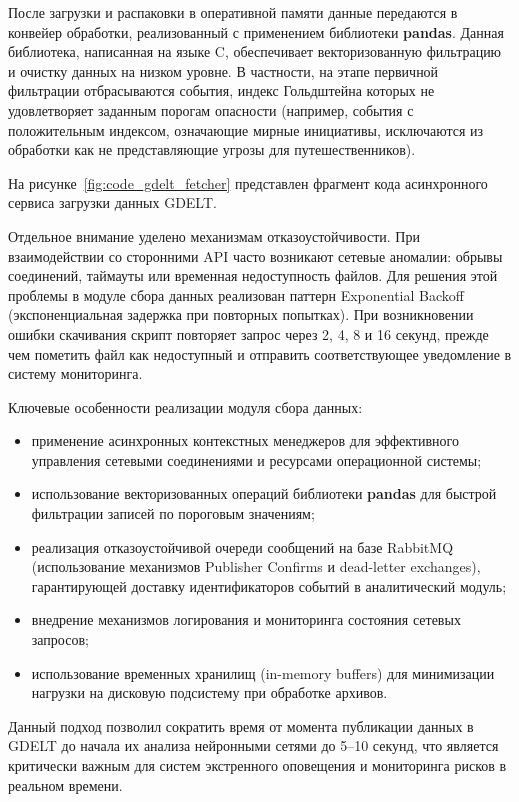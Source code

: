 После загрузки и распаковки в оперативной памяти данные передаются в конвейер обработки, реализованный с применением библиотеки \textbf{pandas}. Данная библиотека, написанная на языке C, обеспечивает векторизованную фильтрацию и очистку данных на низком уровне. В частности, на этапе первичной фильтрации отбрасываются события, индекс Гольдштейна которых не удовлетворяет заданным порогам опасности (например, события с положительным индексом, означающие мирные инициативы, исключаются из обработки как не представляющие угрозы для путешественников).

На рисунке~\ref{fig:code_gdelt_fetcher} представлен фрагмент кода асинхронного сервиса загрузки данных GDELT.


Отдельное внимание уделено механизмам отказоустойчивости. При взаимодействии со сторонними API часто возникают сетевые аномалии: обрывы соединений, таймауты или временная недоступность файлов. Для решения этой проблемы в модуле сбора данных реализован паттерн Exponential Backoff (экспоненциальная задержка при повторных попытках). При возникновении ошибки скачивания скрипт повторяет запрос через 2, 4, 8 и 16 секунд, прежде чем пометить файл как недоступный и отправить соответствующее уведомление в систему мониторинга.

Ключевые особенности реализации модуля сбора данных:
\begin{itemize}
    \item применение асинхронных контекстных менеджеров для эффективного управления сетевыми соединениями и ресурсами операционной системы;
    \item использование векторизованных операций библиотеки \textbf{pandas} для быстрой фильтрации записей по пороговым значениям;
    \item реализация отказоустойчивой очереди сообщений на базе RabbitMQ (использование механизмов Publisher Confirms и dead-letter exchanges), гарантирующей доставку идентификаторов событий в аналитический модуль;
    \item внедрение механизмов логирования и мониторинга состояния сетевых запросов;
    \item использование временных хранилищ (in-memory buffers) для минимизации нагрузки на дисковую подсистему при обработке архивов.
\end{itemize}

Данный подход позволил сократить время от момента публикации данных в GDELT до начала их анализа нейронными сетями до 5--10 секунд, что является критически важным для систем экстренного оповещения и мониторинга рисков в реальном времени.

